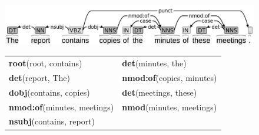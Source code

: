 \begin{figure}[]
	\begin{minipage}{\textwidth}
		\begin{minipage}{.9\textwidth}
		\centering
		\includegraphics[width=0.9\linewidth]{images/Chapitre3/tree_deps_report.png}
		\label{fig:tree_deps_report}
		\end{minipage} 
		\vspace{1cm}
		
		\begin{minipage}{.9\textwidth}
		\centering
		\begin{tabular}{@{}ll@{}}
		 \textbf{root}(root, contains)    & \textbf{det}(minutes, the)       \\
		 \textbf{det}(report, The)        & \textbf{nmod:of}(copies, minutes)   \\
		 \textbf{dobj}(contains, copies)  & \textbf{det}(meetings, these)    \\
		 \textbf{nmod:of}(minutes, meetings)       & \textbf{nmod}(minutes, meetings) \\
		 \textbf{nsubj}(contains, report) &
		 \end{tabular}
		 \label{tab:depends_report}
		\end{minipage} 
	\end{minipage}	
\end{figure}


